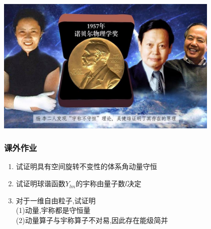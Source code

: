 \begin{frame}
    \centering
    \includegraphics[width=0.8\textwidth]{figs/2021-12-18-00-23-17.png} \\
\end{frame} 

\begin{frame}
    \frametitle{课外作业}
    \begin{enumerate}
        \item 试证明具有空间旋转不变性的体系角动量守恒  
        \item 试证明球谐函数$Y_{lm}$的宇称由量子数$l$决定  
        \item 对于一维自由粒子,试证明 \\
                (1)动量,宇称都是守恒量 \\
                (2)动量算子与宇称算子不对易,因此存在能级简并
    \end{enumerate}
\end{frame}

